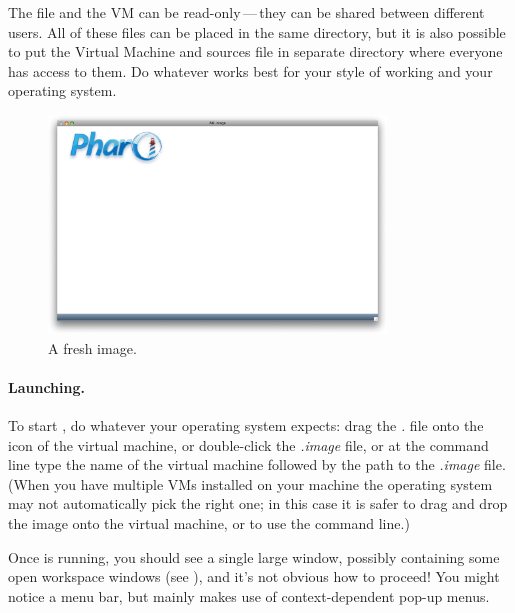 \documentclass[a4paper,10pt,twoside]{book}
\begin{document}
The  file and the VM can be read-only\,---\,they can be shared between different users.
All of these files can be placed in the same directory, but it is also possible to put the Virtual Machine and sources file in separate directory where everyone has access to them.
Do whatever works best for your style of working and your operating system.


\begin{figure}[htb]
\centerline {\includegraphics[width=0.8\textwidth]{startup}}
\caption{A fresh \pbe image.\label{fig:startup}}
\end{figure}

\paragraph{Launching.} To start \pharo, do whatever your operating system expects: drag the \emph{.} file onto the icon of the virtual machine, or double-click the \emph{.image} file, or  at the command line type the name of the virtual machine followed by the path to the \emph{.image} file. (When you have multiple VMs installed on your machine the operating system may not automatically pick the right one; in this case it is safer to drag and drop the image onto the virtual machine, or to use the command line.)

Once \pharo is running, you should see a single large window, possibly containing some open workspace windows (see ), and it's not obvious how to proceed!
You might notice a menu bar, but \pharo mainly makes use of context-dependent pop-up menus.
\end{document}
